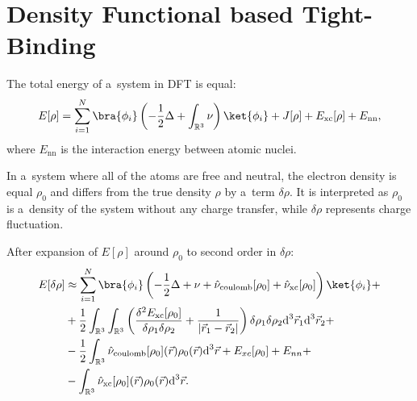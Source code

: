 \section{Density Functional based Tight-Binding}

The total energy of a~system in DFT is equal:
\begin{equation}
    E[\rho] = \sum_{i = 1}^N \bra{\phi_i} \left(-\frac{1}{2} \Delta + \int_{\mathbb{R}^3} \nu \right) \ket{\phi_i} + J[\rho] + E_{\text{xc}}[\rho] + E_{\text{nn}},
\end{equation}
where $E_{\text{nn}}$ is the interaction energy between atomic nuclei.

In a~system where all of the atoms are free and neutral, the electron density is equal $\rho_0$ and differs from the true density $\rho$ by a~term $\delta \rho$. It is interpreted as $\rho_0$ is a~density of the system without any charge transfer, while $\delta \rho$ represents charge fluctuation.

After expansion of $E[\rho]$ around $\rho_0$ to second order in $\delta \rho$:
\begin{align}
  \begin{split}
    E[\delta \rho] &\approx \sum_{i = 1}^N \bra{\phi_i} \left( -\frac{1}{2} \Delta + \nu + \hat{\nu}_{\text{coulomb}}[\rho_0] + \hat{\nu}_{\text{xc}}[\rho_0] \right) \ket{\phi_i} + \\ 
      &+ \frac{1}{2} \int_{\mathbb{R}^3} \int_{\mathbb{R}^3} \left( \frac{\delta^2 E_{\text{xc}}[\rho_0]}{\delta \rho_1 \delta \rho_2} + \frac{1}{\left| \vec{r}_1 - \vec{r}_2 \right|} \right) \delta \rho_1 \delta \rho_2 \text{d}^3\vec{r}_1 \text{d}^3\vec{r}_2 + \\
      &- \frac{1}{2} \int_{\mathbb{R}^3} \hat{\nu}_{\text{coulomb}}[\rho_0](\vec{r}) \rho_0(\vec{r}) \text{d}^3\vec{r} + E_{xc}[\rho_0] + E_{nn} +\\
      &- \int_{\mathbb{R}^3} \hat{\nu}_{\text{xc}}[\rho_0](\vec{r}) \rho_0(\vec{r}) \text{d}^3\vec{r}.
  \end{split}
  \label{eq:dftb-energy}
\end{align}


